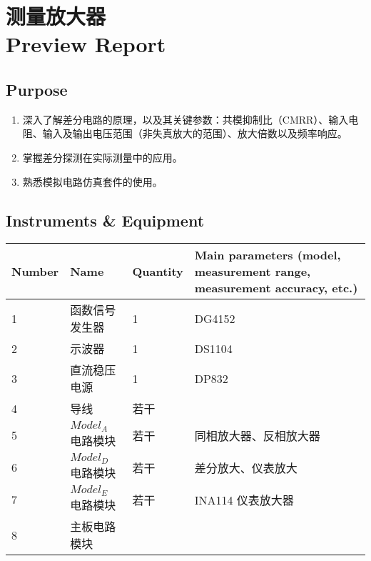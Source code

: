 
\setcounter{section}{0}
\section{测量放大器 \\ Preview Report}


\subsection{Purpose}
\begin{enumerate}
	\item 深入了解差分电路的原理，以及其关键参数：共模抑制比（CMRR）、输入电阻、输入及输出电压范围（非失真放大的范围）、放大倍数以及频率响应。
	\item 掌握差分探测在实际测量中的应用。
	\item 熟悉模拟电路仿真套件的使用。
\end{enumerate}


\subsection{Instruments \& Equipment}
\begin{table}[htbp]
	\centering
	\renewcommand\arraystretch{1.6}
	\begin{tabular}{|p{}|p{}|p{}|p{}|}
		\hline
		Number & Name & Quantity & Main parameters (model, measurement range, measurement accuracy, etc.) \\
		\hline
		1 & 函数信号发生器 & 1 & DG4152 \\

		2 & 示波器 & 1 & DS1104 \\

		3 & 直流稳压电源 & 1 & DP832 \\

		4 & 导线 & 若干 &  \\

		5 & $Model_A$ 电路模块 & 若干 & 同相放大器、反相放大器 \\

		6 & $Model_D$ 电路模块 & 若干 &  差分放大、仪表放大 \\

		7 & $Model_E$ 电路模块 & 若干 & INA114 仪表放大器 \\

		8 & 主板电路模块 &  &  \\
		\hline
	\end{tabular}
\end{table}


